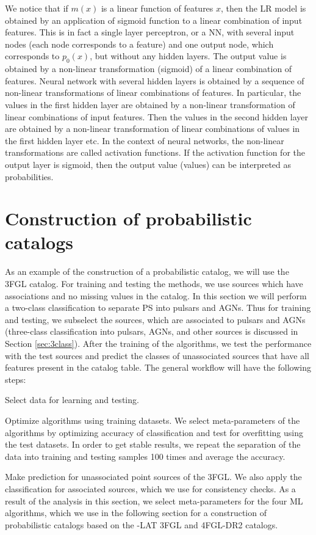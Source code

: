 We notice that if $m(x)$ is a linear function of features $x$, then the LR model is obtained by an application of sigmoid function to a linear combination of input features.
This is in fact a single layer perceptron, or a NN, with several input nodes (each node corresponds to a feature) and one output node, which corresponds to $p_0(x)$, but without any hidden layers.
The output value is obtained by a non-linear transformation (sigmoid) of a linear combination of features.
Neural network with several hidden layers is obtained by a sequence of non-linear transformations of linear combinations of features.
In particular, the values in the first hidden layer are obtained by a non-linear transformation of linear combinations of input features.
Then the values in the second hidden layer are obtained by a non-linear transformation of linear combinations of values in the first hidden layer etc.
In the context of neural networks, the non-linear transformations are called activation functions.
If the activation function for the output layer is sigmoid, then the output value (values) can be interpreted as probabilities.


\section{Construction of probabilistic catalogs}

As an example of the construction of a probabilistic catalog, we will use the 3FGL catalog.
For training and testing the methods, we use sources which have associations and no missing values in the catalog.
In this section we will perform a two-class classification to separate PS into pulsars and AGNs.
Thus for training and testing, we subselect the sources, which are associated to pulsars and AGNs
(three-class classification into pulsars, AGNs, and other sources is discussed in Section \ref{sec:3class}).
After the training of the algorithms, we test the performance with the test sources and predict the classes of unassociated sources that have all features present in the catalog table.
The general workflow will have the following steps:
\ben
\item
Select data for learning and testing.
\item
Optimize algorithms using training datasets.
We select meta-parameters of the algorithms by optimizing accuracy of classification and test for overfitting using the test datasets.
In order to get stable results, we repeat the separation of the data into training and testing samples 100 times and 
average the accuracy.
\item
Make prediction for unassociated point sources of the 3FGL.
We also apply the classification for associated sources, which we use for consistency checks.
\een
As a result of the analysis in this section, we select meta-parameters for the four ML algorithms,
which we use in the following section for a construction of probabilistic catalogs
based on the \Fermi-LAT 3FGL and 4FGL-DR2 catalogs.



